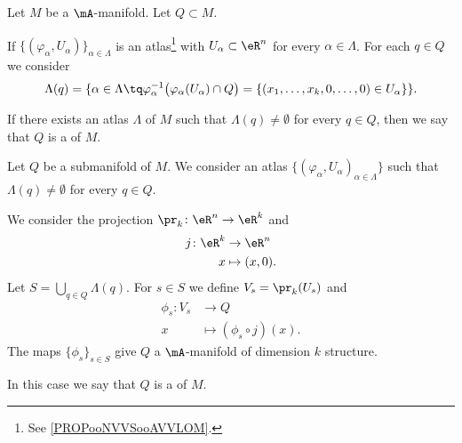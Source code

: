 \begin{definition}[submanifold]      \label{DEFooLQHWooMOTgzq}
	Let \( M\) be a \( \mA\)-manifold. Let \( Q\subset M\).

	If \( \{ (\varphi_{\alpha},U_{\alpha}) \}_{\alpha\in \Lambda}\) is an atlas\footnote{See \ref{PROPooNVVSooAVVLOM}.} with \( U_{\alpha}\subset \eR^n\) for every \( \alpha\in \Lambda\). For each \( q\in Q\) we consider
	\begin{equation}
		\Lambda(q)=\{ \alpha\in\Lambda\tq \varphi_{\alpha}^{-1}\big( \varphi_{\alpha}(U_{\alpha})\cap Q \big)=\{ (x_1,\ldots,x_k,0,\ldots,0)\in U_{\alpha} \} \}.
	\end{equation}

	If there exists an atlas \( \Lambda\) of \( M\) such that \( \Lambda(q)\neq\emptyset\) for every \( q\in Q\), then we say that \( Q\) is a  of \( M\).
\end{definition}


\begin{proposition}	\label{PROPooMKLBooTkqrph}
	Let \( Q\) be a submanifold of \( M\). We consider an atlas \( \{ (\varphi_{\alpha},U_{\alpha})_{\alpha\in \Lambda} \}\) such that \( \Lambda(q)\neq \emptyset\) for every \( q\in Q\).

	We consider the projection \(\pr_k \colon \eR^n\to \eR^k  \) and
	\begin{equation}
		\begin{aligned}
			j\colon \eR^k & \to \eR^n      \\
			x             & \mapsto (x,0).
		\end{aligned}
	\end{equation}
	Let \( S=\bigcup_{q\in Q}\Lambda(q)\). For \( s\in S\) we define \( V_s=\pr_k(U_s)\) and
	\begin{equation}
		\begin{aligned}
			\phi_s\colon V_s & \to Q                       \\
			x                & \mapsto (\phi_s\circ j)(x).
		\end{aligned}
	\end{equation}
	The maps \( \{ \phi_s \}_{s\in S}\) give \( Q\) a \( \mA\)-manifold of dimension \( k\) structure.

	In this case we say that \( Q\) is a  of \( M\).

\end{proposition}

